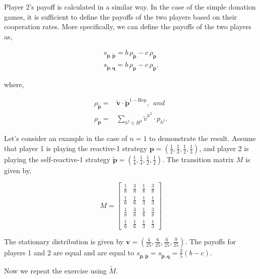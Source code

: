 \documentclass{article}
\theoremstyle{definition}
\begin{document}
Player 2's payoff is calculated in a similar way. In the case of the simple
donation games, it is sufficient to define the payoffs of the two players based
on their cooperation rates. More specifically, we can define the payoffs of the
two players as,

\begin{equation} \label{Eq:payoff}
  \begin{array}{lll}
  s_{\mathbf{p}, \mathbf{\tilde{p}}}  =  b\, \rho_\mathbf{\tilde{p}} - c\, \rho_\mathbf{p}\\
  s_{\mathbf{\tilde{p}}, \mathbf{q}} = b\, \rho_\mathbf{p} - c\, \rho_\mathbf{\tilde{p}}.
  \end{array}
\end{equation}

where, 

\begin{align}
  \rho_\mathbf{\tilde{p}} = &  \mathbf{\tilde{v}} \cdot \mathbf{\tilde{p}}^{1 - \text{Rep}}, ~~and~~ \\
  \rho_\mathbf{p} = & \sum_{h^2 \in H^2} \tilde{v}^{h^2} \cdot p_{h^2}.
\end{align}


Let's consider an example in the case of $n=1$ to demonstrate the result. Assume
that player 1 is playing the reactive-1 strategy $\mathbf{p}=(\frac{1}{2},
\frac{1}{3}, \frac{1}{2}, \frac{1}{3})$, and player 2 is playing the
self-reactive-1 strategy $\mathbf{\tilde{p}} = (\frac{1}{4}, \frac{1}{4},
\frac{1}{2}, \frac{1}{2})$. The transition matrix $M$ is given by,

$$
M = \begin{bmatrix}
  \frac{1}{8} & \frac{3}{8} & \frac{1}{8} & \frac{3}{8} \\[6pt]
  \frac{1}{6} & \frac{1}{6} & \frac{1}{3} & \frac{1}{3} \\[6pt]
  \frac{1}{8} & \frac{3}{8} & \frac{1}{8} & \frac{3}{8} \\[6pt]
  \frac{1}{6} & \frac{1}{6} & \frac{1}{3} & \frac{1}{3}
\end{bmatrix}
$$

The stationary distribution is given by $\mathbf{v} = (\frac{4}{25},
\frac{6}{25}, \frac{6}{25}, \frac{9}{25})$. The payoffs for players 1 and 2 are
equal and are equal to $s_{\mathbf{p}, \mathbf{\tilde{p}}} =
s_{\mathbf{\tilde{p}}, \mathbf{q}}= \frac{2}{5}(b -c)$.

Now we repeat the exercise using $\tilde{M}$.
\end{document}
